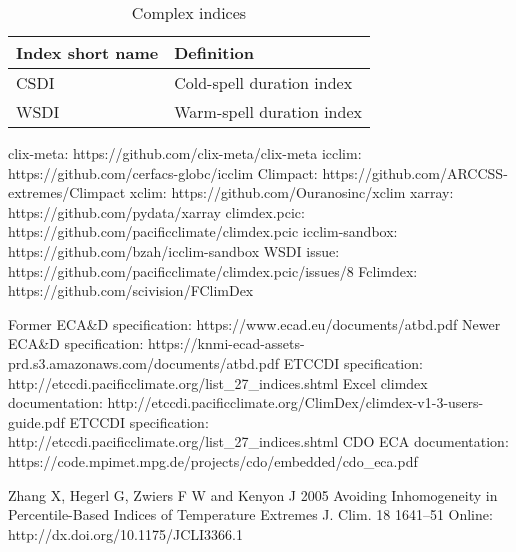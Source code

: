 \documentclass[a4paper,11pt]{article}
\begin{document}
    \begin{table}[h]
    \begin{tabular}{l p{10cm}}
Index short name  &   Definition                                                                                                     \\
\hline
    CSDI          &   Cold-spell duration index                                                                                      \\
    WSDI          &   Warm-spell duration index                                                                                      \\          
    \end{tabular}
    \caption{Complex indices}
    \label{table/complex_indices}
    \end{table}

\begin{thebibliography}{1}
        clix-meta: https://github.com/clix-meta/clix-meta
        icclim: https://github.com/cerfacs-globc/icclim
        Climpact: https://github.com/ARCCSS-extremes/Climpact
        xclim: https://github.com/Ouranosinc/xclim
        xarray: https://github.com/pydata/xarray
        climdex.pcic: https://github.com/pacificclimate/climdex.pcic    
        icclim-sandbox: https://github.com/bzah/icclim-sandbox
        WSDI issue: https://github.com/pacificclimate/climdex.pcic/issues/8
        Fclimdex: https://github.com/scivision/FClimDex
        
        Former ECA\&D specification: https://www.ecad.eu/documents/atbd.pdf
        Newer ECA\&D specification: https://knmi-ecad-assets-prd.s3.amazonaws.com/documents/atbd.pdf
        ETCCDI specification: http://etccdi.pacificclimate.org/list\_27\_indices.shtml
        Excel climdex documentation: http://etccdi.pacificclimate.org/ClimDex/climdex-v1-3-users-guide.pdf
        ETCCDI specification: http://etccdi.pacificclimate.org/list\_27\_indices.shtml
        CDO ECA documentation: https://code.mpimet.mpg.de/projects/cdo/embedded/cdo\_eca.pdf

        Zhang X, Hegerl G, Zwiers F W and Kenyon J 2005 Avoiding Inhomogeneity in Percentile-Based Indices of Temperature Extremes J. Clim. 18 1641–51 Online: http://dx.doi.org/10.1175/JCLI3366.1
\end{thebibliography}
\end{document}
